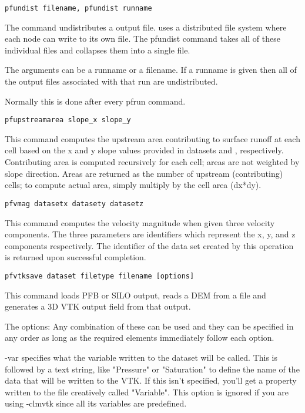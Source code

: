 \begin{description}
\item{\begin{verbatim}pfundist filename, pfundist runname\end{verbatim}}
The command undistributes a \parflow{} output file.  \parflow{} uses a
distributed file system where each node can write to its own file.
The pfundist command takes all of these individual files and collapses
them into a single file.

The arguments can be a runname or a filename.  If a runname is given
then all of the output files associated with that run are
undistributed.

Normally this is done after every pfrun command.


\item{\begin{verbatim}pfupstreamarea slope_x slope_y\end{verbatim}}
This command computes the upstream area contributing to surface runoff
at each cell based on the x and y slope values provided in datasets
 and , respectively. Contributing area is computed recursively
for each cell; areas are not weighted by slope direction. Areas are returned
as the number of upstream (contributing) cells; to compute actual area, simply
multiply by the cell area (dx*dy).


\item{\begin{verbatim}pfvmag datasetx datasety datasetz\end{verbatim}}
This command computes the velocity magnitude when given three velocity
components.  The three parameters are identifiers which represent
the x, y, and z components respectively.  The identifier of the data
set created by this operation is returned upon successful completion.


\item{\begin{verbatim}pfvtksave dataset filetype filename [options]\end{verbatim}}
This command loads PFB or SILO output, reads a DEM from a file and generates
a 3D VTK output field from that \parflow{} output.

The options:
Any combination of these can be used and they can be specified in any order as long as the required elements immediately follow each option.

-var specifies what the variable written to the dataset will be called. This is followed by a text string, like "Pressure" or "Saturation" to define the name of the data that will be written to the VTK. If this isn't specified, you'll get a property written to the file creatively called "Variable". This option is ignored if you are using -clmvtk since all its variables are predefined.


\end{description}
